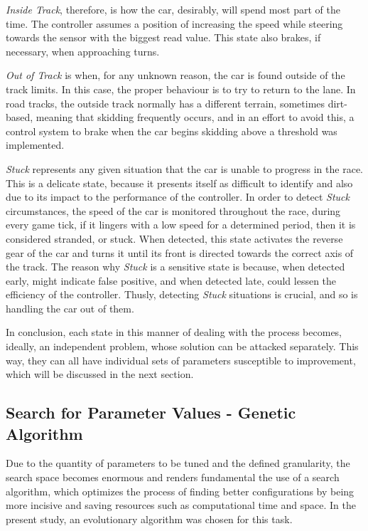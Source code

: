 	\emph{Inside Track}, therefore, is how the car, desirably, will spend most part of the time. The controller
	assumes a position of increasing the speed while steering towards the sensor with the biggest read value. This
	state also brakes, if necessary, when approaching turns.
		
	\emph{Out of Track} is when, for any unknown reason, the car is found outside of the track limits. In this case,
	the proper behaviour is to try to return to the lane. In road tracks, the outside track normally has a different
	terrain, sometimes dirt-based, meaning that skidding frequently occurs, and in an effort to avoid this, a control
	system to brake when the car begins skidding above a threshold was implemented.
	
	\emph{Stuck} represents any given situation that the car is unable to progress in the race. This is a delicate
	state, because it presents itself as difficult to identify and also due to its impact to the performance of the
	controller. In order to detect \emph{Stuck} circumstances, the speed of the car is monitored throughout the race,
	during every game tick, if it lingers with a low speed for a determined period, then it is considered stranded,
	or stuck. When detected, this state activates the reverse gear of the car and turns it until its front is
	directed towards the correct axis of the track. The reason why \emph{Stuck} is a sensitive state is because, when
	detected early, might indicate false positive, and when detected late, could lessen the efficiency of the
	controller. Thusly, detecting \textit{Stuck} situations is crucial, and so is handling the car out of them.
	
	In conclusion, each state in this manner of dealing with the process becomes, ideally, an independent problem,
	whose solution can be attacked separately. This way, they can all have individual sets of parameters susceptible
	to improvement, which will be discussed in the next section.
	
\subsection{Search for Parameter Values - Genetic Algorithm} \label{subsec:GA}
	
	Due to the quantity of parameters to be tuned and the defined granularity, the search space becomes enormous and
	renders fundamental the use of a search algorithm, which optimizes the process of finding better configurations
	by being more incisive and saving resources such as computational time and space. In the present study, an
	evolutionary algorithm was chosen for this task.
	
